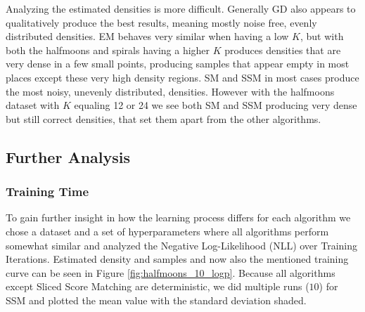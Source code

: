 Analyzing the estimated densities is more difficult. Generally GD also 
appears to qualitatively produce the best results, meaning mostly noise free, evenly distributed densities. 
EM behaves very similar when having a low $K$, but with both the halfmoons and spirals 
having a higher $K$ produces densities that are very dense in a few small points, producing samples
that appear empty in most places except these very high density regions. 
SM and SSM in most cases produce the most noisy, unevenly distributed, densities. However 
with the halfmoons dataset with $K$ equaling 12 or 24 we see both SM and SSM producing 
very dense but still correct densities, that set them apart from the other algorithms.

\subsection{Further Analysis}
\label{sec:2d_exp2}

\subsubsection{Training Time}

To gain further insight in how the learning process differs for each algorithm we chose a dataset and a set of hyperparameters
where all algorithms perform somewhat similar and analyzed the Negative Log-Likelihood (NLL) over Training Iterations. 
Estimated density and samples and now also the mentioned training curve can be seen in Figure \ref{fig:halfmoons_10_logp}. Because all algorithms except Sliced Score Matching are deterministic, we did multiple runs ($10$) for SSM and plotted the mean value 
with the standard deviation shaded. 

